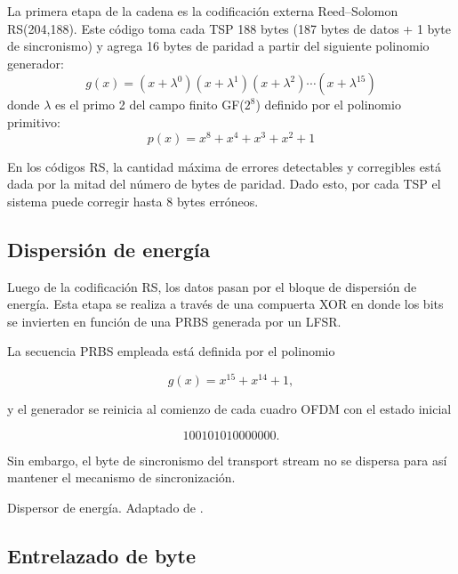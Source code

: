 La primera etapa de la cadena es la codificación externa Reed--Solomon RS(204,188). Este código toma cada TSP 188 bytes (187 bytes de datos + 1 byte de sincronismo) y agrega 16 bytes de paridad a partir del siguiente polinomio generador:
\begin{equation} g(x) = (x + \lambda^0)(x + \lambda^1)(x + \lambda^2) \cdots (x + \lambda^{15})
\end{equation}
donde $\lambda$ es el primo 2 del campo finito GF($2^8$) definido por el polinomio primitivo:
\begin{equation}
    p(x) = x^8 + x^4 + x^3 + x^2 + 1
\end{equation}


En los códigos RS, la cantidad máxima de errores detectables y corregibles está dada por la mitad del número de bytes de paridad. Dado esto, por cada TSP el sistema puede corregir hasta 8 bytes erróneos.


\subsection{Dispersión de energía}

Luego de la codificación RS, los datos pasan por el bloque de dispersión de energía. Esta etapa se realiza a través de una compuerta XOR en donde los bits se invierten en función de una PRBS generada por un LFSR.

La secuencia PRBS empleada está definida por el polinomio

\begin{equation}
g(x)=x^{15}+x^{14}+1,
\end{equation}

y el generador se reinicia al comienzo de cada cuadro OFDM con el estado inicial

\begin{equation}
100101010000000.
\end{equation}

Sin embargo, el byte de sincronismo del transport stream no se dispersa para así mantener el mecanismo de sincronización.

{Dispersor de energía.}
{Adaptado de \cite{isdbt}.}
{\label{fig:prbs}}

\subsection{Entrelazado de byte}


